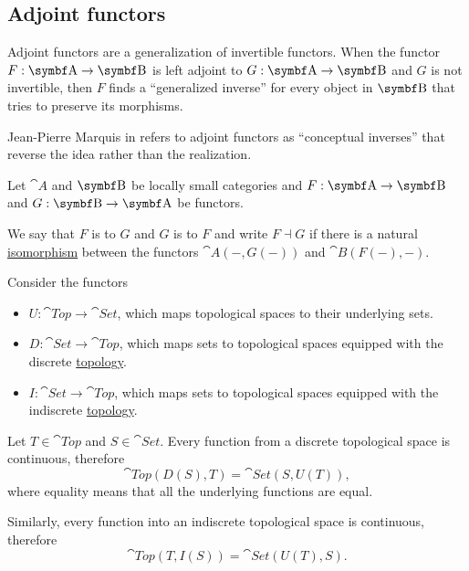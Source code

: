 \subsection{Adjoint functors}\label{subsec:adjoint_functors}

\begin{remark}\label{def:adjoint_functors}
  Adjoint functors are a generalization of invertible functors. When the functor \( F: \cat{A} \to \bop B \) is left adjoint to \( G: \cat{A} \to \bop B \) and \( G \) is not invertible, then \( F \) finds a \enquote{generalized inverse} for every object in \( \bop B \) that tries to preserve its morphisms.

  Jean-Pierre Marquis in \cite{StanfordPlato:category_theory} refers to adjoint functors as \enquote{conceptual inverses} that reverse the idea rather than the realization.
\end{remark}

\begin{definition}\label{def:adjoint_functor}\mcite\cite[exer. 4.1.32]{Leinster2014}
  Let \( \cat{A} \) and \( \bop B \) be locally small categories and \( F: \cat{A} \to \bop B \) and \( G: \bop B \to \cat{A} \) be functors.

  We say that \( F \) is  to \( G \) and \( G \) is  to \( F \) and write \( F \dashv G \) if there is a natural \hyperref[def:natural_isomorpism]{isomorphism} between the functors \( \cat{A}(-, G(-)) \) and \( \cat{B}(F(-), -) \).
\end{definition}

\begin{example}\label{ex:top_adjoint_functor}\mcite\cite[exmpl. 2.1.5]{Leinster2014}
  Consider the functors
  \begin{itemize}
    \item \( U: \cat{Top} \to \cat{Set} \), which maps topological spaces to their underlying sets.
    \item \( D: \cat{Set} \to \cat{Top} \), which maps sets to topological spaces equipped with the discrete \hyperref[def:standard_topologies/discrete]{topology}.
    \item \( I: \cat{Set} \to \cat{Top} \), which maps sets to topological spaces equipped with the indiscrete \hyperref[def:standard_topologies/indiscrete]{topology}.
  \end{itemize}

  Let \( T \in \cat{Top} \) and \( S \in \cat{Set} \). Every function from a discrete topological space is continuous, therefore
  \begin{equation*}
    \cat{Top}(D(S), T) = \cat{Set}(S, U(T)),
  \end{equation*}
  where equality means that all the underlying functions are equal.

  Similarly, every function into an indiscrete topological space is continuous, therefore
  \begin{equation*}
    \cat{Top}(T, I(S)) = \cat{Set}(U(T), S).
  \end{equation*}
\end{example}
